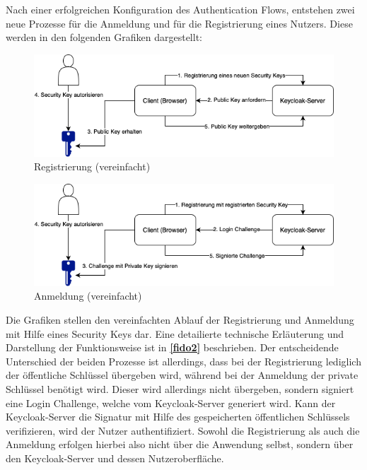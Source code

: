 Nach einer erfolgreichen Konfiguration des Authentication Flows, entstehen zwei neue Prozesse für die Anmeldung und für die Registrierung eines Nutzers. Diese werden in den folgenden Grafiken dargestellt:

\begin{figure}[H]
	\centering 
	\includegraphics[width=1\textwidth]{img/abbildungen/register_simplified.png}
	\captionsetup{format=hang}
	\caption{Registrierung (vereinfacht)}
\end{figure}

\begin{figure}[H]
	\centering 
	\includegraphics[width=1\textwidth]{img/abbildungen/login_simplified.png}
	\captionsetup{format=hang}
	\caption{Anmeldung (vereinfacht)}
\end{figure}

Die Grafiken stellen den vereinfachten Ablauf der Registrierung und Anmeldung mit Hilfe eines Security Keys dar. Eine detailierte technische Erläuterung und Darstellung der Funktionsweise ist in \textbf{\ref{fido2}} beschrieben. Der entscheidende Unterschied der beiden Prozesse ist allerdings, dass bei der Registrierung lediglich der öffentliche Schlüssel übergeben wird, während bei der Anmeldung der private Schlüssel benötigt wird. Dieser wird allerdings nicht übergeben, sondern signiert eine Login Challenge, welche vom Keycloak-Server generiert wird. Kann der Keycloak-Server die Signatur mit Hilfe des gespeicherten öffentlichen Schlüssels verifizieren, wird der Nutzer authentifiziert. Sowohl die Registrierung als auch die Anmeldung erfolgen hierbei also nicht über die Anwendung selbst, sondern über den Keycloak-Server und dessen Nutzeroberfläche.

